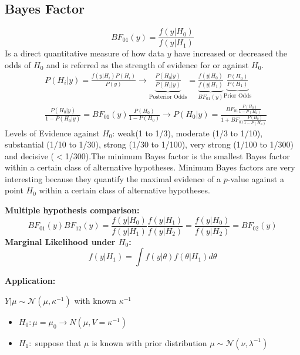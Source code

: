 \documentclass{article}\usepackage[]{graphicx}\usepackage[]{xcolor}
\begin{document}
\begin{multicols*}{2}
\subsection{Bayes Factor}
\begin{equation}
\boxed{BF_{01}(y)=\frac{f(y|H_0)}{f(y|H_1)}}
\end{equation}
Is a direct quantitative measure of how data $y$ have increased or decreased the odds of $H_0$ and is referred as the strength of evidence for or against $H_0$.
\begin{align*}
&P(H_i|y)=\frac{f(y|H_i)P(H_i)}{P(y)}\rightarrow\underbrace{\frac{P(H_0|y)}{P(H_1|y)}}_{\text{Posterior Odds}}=\underbrace{\frac{f(y|H_0)}{f(y|H_1)}}_{BF_{01}(y)}\underbrace{\frac{P(H_0)}{P(H_1)}}_{\text{Prior Odds}}\\
&\frac{P(H_0|y)}{1-P(H_0|y)}=BF_{01}(y)\frac{P(H_0)}{1-P(H_0)}\rightarrow P(H_0|y)=\frac{BF_{01}\frac{P(H_0)}{1-P(H_0)}}{1+BF_{01}\frac{P(H_0)}{1-P(H_0)}}
\end{align*}
Levels of Evidence against $H_0$: weak(1 to 1/3), moderate (1/3 to 1/10), substantial (1/10 to 1/30), strong (1/30 to 1/100), very strong (1/100 to 1/300) and decisive ($<$1/300).The minimum Bayes factor is the smallest Bayes factor within a certain class of alternative hypotheses. Minimum Bayes factors are very interesting because they quantify the maximal evidence of a $p$-value against a point $H_0$ within a certain class of alternative hypotheses.

\textbf{Multiple hypothesis comparison:}
$$
BF_{01}(y)BF_{12}(y)=\frac{f(y|H_0)}{f(y|H_1)}\frac{f(y|H_1)}{f(y|H_2)}=\frac{f(y|H_0)}{f(y|H_2)}=BF_{02}(y)
$$
\textbf{Marginal Likelihood under $H_0$:}
\begin{equation}
\boxed{f(y|H_1)=\int f(y|\theta)f(\theta|H_1)d\theta}
\end{equation}

\textbf{Application:}

$Y|\mu\sim\mathcal{N}(\mu,\kappa^{-1})$ with known $\kappa^{-1}$
\begin{itemize}
\item $H_0:\mu=\mu_0\rightarrow N(\mu,V=\kappa^{-1})$
\item $H_1:$ suppose that $\mu$ is known with prior distribution $\mu\sim\mathcal{N}(\nu,\lambda^{-1})$ 
\end{itemize}


\end{multicols*}
\end{document}
